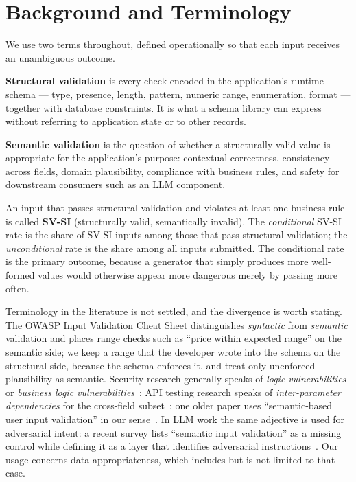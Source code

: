 \documentclass[conference]{IEEEtran}
\begin{document}
\section{Background and Terminology}
\label{sec:background}

We use two terms throughout, defined operationally so that each input receives an unambiguous
outcome.

\textbf{Structural validation} is every check encoded in the application's runtime schema --- type,
presence, length, pattern, numeric range, enumeration, format --- together with database
constraints. It is what a schema library can express without referring to application state or to
other records.

\textbf{Semantic validation} is the question of whether a structurally valid value is appropriate for
the application's purpose: contextual correctness, consistency across fields, domain plausibility,
compliance with business rules, and safety for downstream consumers such as an LLM component.

An input that passes structural validation and violates at least one business rule is called
\textbf{SV-SI} (structurally valid, semantically invalid). The \emph{conditional} SV-SI rate is the
share of SV-SI inputs among those that pass structural validation; the \emph{unconditional} rate is
the share among all inputs submitted. The conditional rate is the primary outcome, because a
generator that simply produces more well-formed values would otherwise appear more dangerous merely
by passing more often.

Terminology in the literature is not settled, and the divergence is worth stating. The OWASP Input
Validation Cheat Sheet distinguishes \emph{syntactic} from \emph{semantic} validation and places
range checks such as ``price within expected range'' on the semantic side; we keep a range that the
developer wrote into the schema on the structural side, because the schema enforces it, and treat
only unenforced plausibility as semantic. Security research generally speaks of \emph{logic
vulnerabilities}~\cite{felmetsger2010waler,pellegrino2014logicflaws} or \emph{business logic
vulnerabilities}~\cite{metin2025blv}; API testing research speaks of \emph{inter-parameter
dependencies} for the cross-field subset~\cite{martinlopez2022idl,martinlopez2019catalogue}; one
older paper uses ``semantic-based user input validation'' in our
sense~\cite{hanna2018semanticvalidation}. In LLM work the same adjective is used for adversarial
intent: a recent survey lists ``semantic input validation'' as a missing control while defining it as
a layer that identifies adversarial instructions~\cite{singh2026injectioninteraction}. Our usage
concerns data appropriateness, which includes but is not limited to that case.
\end{document}
